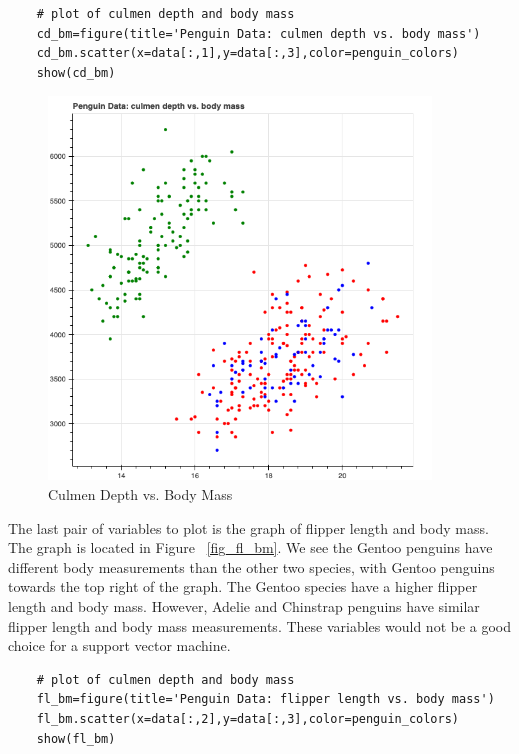\documentclass[12pt]{article}
\begin{document}
\begin{verbatim}
    # plot of culmen depth and body mass
    cd_bm=figure(title='Penguin Data: culmen depth vs. body mass')
    cd_bm.scatter(x=data[:,1],y=data[:,3],color=penguin_colors)
    show(cd_bm)
\end{verbatim}

\begin{figure}[H]
    \centering
    \includegraphics[width=4in]{Figures/penguins/cd_bm.png}
    \caption{Culmen Depth vs. Body Mass}
    \label{fig_cd_bm}
\end{figure}

The last pair of variables to plot is the graph of flipper length and body mass. The graph is located in Figure ~\ref{fig_fl_bm}. We see the Gentoo penguins have different body measurements than the other two species, with Gentoo penguins towards the top right of the graph. The Gentoo species have a higher flipper length and body mass. However, Adelie and Chinstrap penguins have similar flipper length and body mass measurements. These variables would not be a good choice for a support vector machine.

\begin{verbatim}
    # plot of culmen depth and body mass
    fl_bm=figure(title='Penguin Data: flipper length vs. body mass')
    fl_bm.scatter(x=data[:,2],y=data[:,3],color=penguin_colors)
    show(fl_bm)
\end{verbatim}
\end{document}
